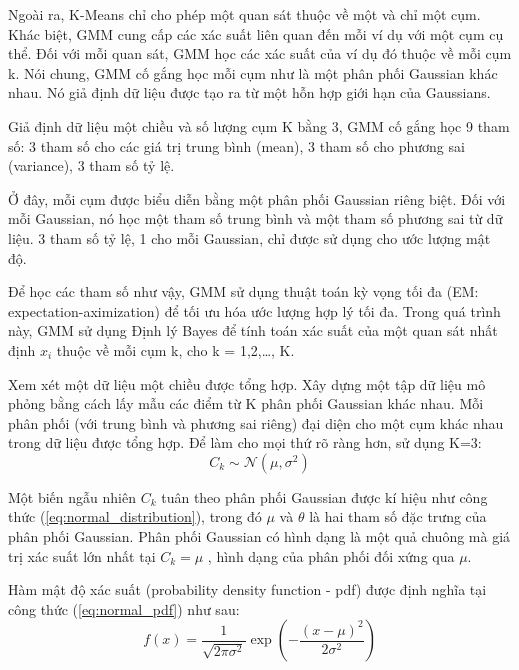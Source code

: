 \documentclass[a4paper]{article}
\begin{document}
Ngoài ra, K-Means chỉ cho phép một quan sát thuộc về một và chỉ một cụm. Khác biệt, GMM cung cấp các xác suất liên quan đến mỗi ví dụ với một cụm cụ thể. Đối với mỗi quan sát, GMM học các xác suất của ví dụ đó thuộc về mỗi cụm k. Nói chung, GMM cố gắng học mỗi cụm như là một phân phối Gaussian khác nhau. Nó giả định dữ liệu được tạo ra từ một hỗn hợp giới hạn của Gaussians.

Giả định dữ liệu một chiều và số lượng cụm K bằng 3, GMM cố gắng học 9 tham số: 3 tham số cho các giá trị trung bình (mean), 3 tham số cho phương sai (variance), 3 tham số tỷ lệ.

Ở đây, mỗi cụm được biểu diễn bằng một phân phối Gaussian riêng biệt. Đối với mỗi Gaussian, nó học một tham số trung bình và một tham số phương sai từ dữ liệu. 3 tham số tỷ lệ, 1 cho mỗi Gaussian, chỉ được sử dụng cho ước lượng mật độ.

Để học các tham số như vậy, GMM sử dụng thuật toán kỳ vọng tối đa (EM: expectation-aximization) để tối ưu hóa ước lượng hợp lý tối đa. Trong quá trình này, GMM sử dụng Định lý Bayes để tính toán xác suất của một quan sát nhất định $x_i$ thuộc về mỗi cụm k, cho k = 1,2,…, K.

Xem xét một dữ liệu một chiều được tổng hợp. Xây dựng một tập dữ liệu mô phỏng bằng cách lấy mẫu các điểm từ K phân phối Gaussian khác nhau. Mỗi phân phối (với trung bình và phương sai riêng) đại diện cho một cụm khác nhau trong dữ liệu được tổng hợp. Để làm cho mọi thứ rõ ràng hơn, sử dụng K=3:
\begin{equation}
    C_k \sim \mathcal{N}(\mu, \sigma^2)
    \label{eq:normal_distribution}
\end{equation}

Một biến ngẫu nhiên $C_k$ tuân theo phân phối Gaussian được kí hiệu như công thức (\ref{eq:normal_distribution}), trong đó $\mu$ và $\theta$  là hai tham số đặc trưng của phân phối Gaussian. Phân phối Gaussian có hình dạng là một quả chuông mà giá trị xác suất lớn nhất tại $C_k = \mu$ , hình dạng của phân phối đối xứng qua $\mu$. 

Hàm mật độ xác suất (probability density function - pdf) được định nghĩa tại công thức (\ref{eq:normal_pdf}) như sau:
\begin{equation}
    f(x) = \frac{1}{\sqrt{2\pi\sigma^2}} \exp\left(-\frac{(x-\mu)^2}{2\sigma^2}\right)
    \label{eq:normal_pdf}
\end{equation}
\end{document}
